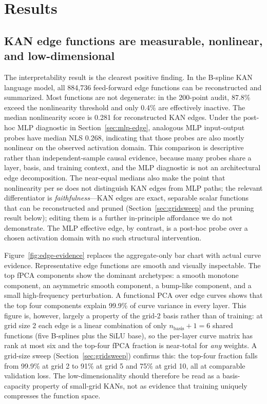 \documentclass{article}
\begin{document}
\section{Results}

\subsection{KAN edge functions are measurable, nonlinear, and low-dimensional}

The interpretability result is the clearest positive finding. In the B-spline KAN language model, all 884,736 feed-forward edge functions can be reconstructed and summarized. Most functions are not degenerate: in the 200-point audit, 87.8\% exceed the nonlinearity threshold and only 0.4\% are effectively inactive. The median nonlinearity score is 0.281 for reconstructed KAN edges. Under the post-hoc MLP diagnostic in Section~\ref{sec:mlp-edge}, analogous MLP input-output probes have median NLS 0.268, indicating that those probes are also mostly nonlinear on the observed activation domain. This comparison is descriptive rather than independent-sample causal evidence, because many probes share a layer, basis, and training context, and the MLP diagnostic is not an architectural edge decomposition. The near-equal medians also make the point that nonlinearity per se does not distinguish KAN edges from MLP paths; the relevant differentiator is \emph{faithfulness}---KAN edges are exact, separable scalar functions that can be reconstructed and pruned (Section~\ref{sec:gridsweep} and the pruning result below); editing them is a further in-principle affordance we do not demonstrate. The MLP effective edge, by contrast, is a post-hoc probe over a chosen activation domain with no such structural intervention.

Figure~\ref{fig:edge-evidence} replaces the aggregate-only bar chart with actual curve evidence. Representative edge functions are smooth and visually inspectable. The top fPCA components show the dominant archetypes: a smooth monotone component, an asymmetric smooth component, a bump-like component, and a small high-frequency perturbation. A functional PCA over edge curves shows that the top four components explain 99.9\% of curve variance in every layer. This figure is, however, largely a property of the grid-2 basis rather than of training: at grid size 2 each edge is a linear combination of only \(n_{\mathrm{basis}}+1=6\) shared functions (five B-splines plus the SiLU base), so the per-layer curve matrix has rank at most six and the top-four fPCA fraction is near-total for \emph{any} weights. A grid-size sweep (Section~\ref{sec:gridsweep}) confirms this: the top-four fraction falls from 99.9\% at grid 2 to 91\% at grid 5 and 75\% at grid 10, all at comparable validation loss. The low-dimensionality should therefore be read as a basis-capacity property of small-grid KANs, not as evidence that training uniquely compresses the function space.
\end{document}
